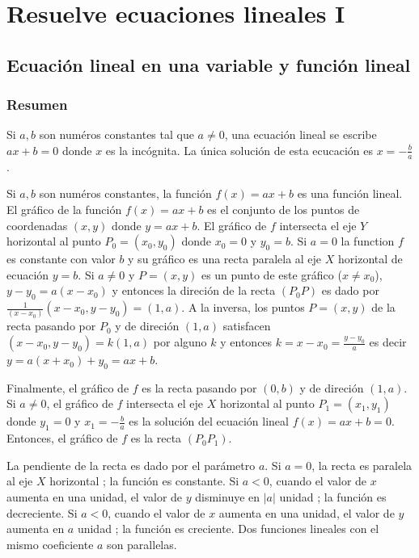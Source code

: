 \chapter{Resuelve ecuaciones lineales I}

\section{Ecuación lineal en una variable y función lineal}

\subsection*{Resumen}

Si $a, b$ son numéros constantes tal que $a \neq 0$, una ecuación lineal
se escribe $ax + b = 0$ donde $x$ es la incógnita. La única solución de esta
ecucación es $x = -\frac{b}{a}$.

Si $a, b$ son numéros constantes, la función $f(x) = ax + b$ es una función
lineal. El gráfico de la función $f(x) = ax + b$ es el conjunto de los puntos de
coordenadas $(x, y)$ donde $y = ax + b$.
El gráfico de $f$ intersecta el eje $Y$ horizontal al punto $P_0 = (x_0, y_0)$
donde $x_0 = 0$ y $y_0 = b$.
Si $a = 0$ la function $f$ es constante
con valor $b$ y su gráfico es una recta paralela al eje $X$ horizontal de
ecuación $y = b$. Si $a \neq 0$ y $P = (x, y)$ es un punto de este
gráfico ($x \neq x_0$), $y - y_0 = a{(x-x_0)}$ y entonces la direción de la
recta $(P_0P)$ es dado por
$\frac{1}{{(x - x_0)}} ({x - x_0}, {y - y_0}) = {(1,a)}$. A la inversa, los
puntos $P = (x, y)$ de la recta pasando por $P_0$ y de direción $(1,a)$
satisfacen $({x - x_0}, {y - y_0}) = k {(1,a)}$ por alguno $k$ y entonces
$k = x - x_0 = \frac{y - y_0}{a}$ es decir $y = a {(x + x_0)} + y_0 = a x + b$.

Finalmente, el gráfico de $f$ es la recta pasando por $(0, b)$ y de direción
$(1,a)$. Si $a \neq 0$, el gráfico de $f$ intersecta el eje $X$
horizontal al punto $P_1 = (x_1, y_1)$ donde $y_1 = 0$ y
$x_1 = -\frac{b}{a}$ es la solución del ecuación lineal $f(x) = ax + b = 0$.
Entonces, el gráfico de $f$ es la recta $(P_0P_1)$.

La pendiente de la recta es dado por el parámetro $a$. Si $a = 0$, 
la recta es paralela al eje $X$ horizontal ; la función es constante.
Si $a < 0$, cuando el valor de $x$ aumenta en una unidad, el valor de $y$
disminuye en $|a|$ unidad ; la función es decreciente.
Si $a < 0$, cuando el valor de $x$ aumenta en una unidad, el valor de $y$
aumenta en $a$ unidad ; la función es creciente. Dos funciones lineales con
el mismo coeficiente $a$ son parallelas.

